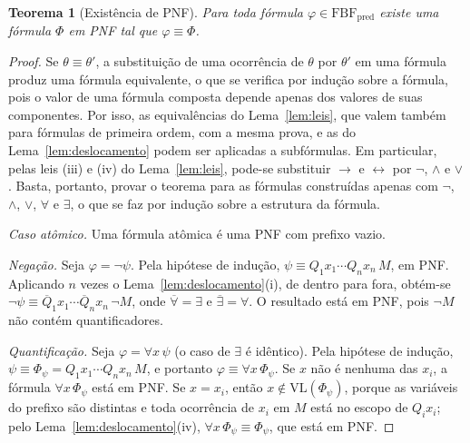 \documentclass[12pt,a4paper,oneside]{report}
\theoremstyle{tituloplain}
\newtheorem{teorema}{Teorema}[chapter]
\theoremstyle{titulodef}
\begin{document}
\begin{teorema}[Existência de PNF]\label{teo:pnf}
Para toda fórmula $\varphi\in\mathrm{FBF}_{\mathrm{pred}}$ existe uma fórmula $\Phi$ em PNF tal que $\varphi\equiv\Phi$.
\end{teorema}
\begin{proof}
Se $\theta\equiv\theta'$, a substituição de uma ocorrência de $\theta$ por $\theta'$ em uma fórmula produz uma fórmula equivalente, o que se verifica por indução sobre a fórmula, pois o valor de uma fórmula composta depende apenas dos valores de suas componentes. Por isso, as equivalências do Lema~\ref{lem:leis}, que valem também para fórmulas de primeira ordem, com a mesma prova, e as do Lema~\ref{lem:deslocamento} podem ser aplicadas a subfórmulas. Em particular, pelas leis (iii) e (iv) do Lema~\ref{lem:leis}, pode-se substituir $\rightarrow$ e $\leftrightarrow$ por $\neg$, $\wedge$ e $\vee$. Basta, portanto, provar o teorema para as fórmulas construídas apenas com $\neg$, $\wedge$, $\vee$, $\forall$ e $\exists$, o que se faz por indução sobre a estrutura da fórmula.

\emph{Caso atômico.} Uma fórmula atômica é uma PNF com prefixo vazio.

\emph{Negação.} Seja $\varphi=\neg\psi$. Pela hipótese de indução, $\psi\equiv Q_1x_1\cdots Q_nx_n\,M$, em PNF. Aplicando $n$ vezes o Lema~\ref{lem:deslocamento}(i), de dentro para fora, obtém-se $\neg\psi\equiv\overline{Q}_1x_1\cdots\overline{Q}_nx_n\,\neg M$, onde $\overline{\forall}=\exists$ e $\overline{\exists}=\forall$. O resultado está em PNF, pois $\neg M$ não contém quantificadores.

\emph{Quantificação.} Seja $\varphi=\forall x\,\psi$ (o caso de $\exists$ é idêntico). Pela hipótese de indução, $\psi\equiv\Phi_\psi=Q_1x_1\cdots Q_nx_n\,M$, e portanto $\varphi\equiv\forall x\,\Phi_\psi$. Se $x$ não é nenhuma das $x_i$, a fórmula $\forall x\,\Phi_\psi$ está em PNF. Se $x=x_i$, então $x\notin\mathrm{VL}(\Phi_\psi)$, porque as variáveis do prefixo são distintas e toda ocorrência de $x_i$ em $M$ está no escopo de $Q_ix_i$; pelo Lema~\ref{lem:deslocamento}(iv), $\forall x\,\Phi_\psi\equiv\Phi_\psi$, que está em PNF.


\end{proof}
\end{document}
